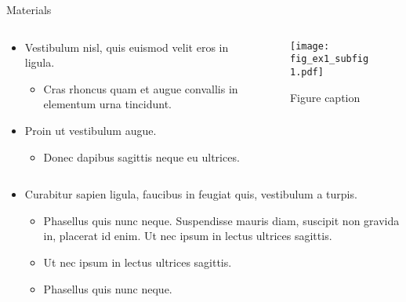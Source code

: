 \begin{block}{Materials}
	
	\begin{columns} %
		\begin{column}{.54\textwidth} %
			\begin{itemize}
				\item Vestibulum nisl, quis euismod velit eros in ligula.
				\begin{itemize}
					\item Cras rhoncus quam et augue convallis in elementum urna tincidunt.
				\end{itemize}
				\item Proin ut vestibulum augue.
				\begin{itemize}
					\item Donec dapibus sagittis neque eu ultrices.
				\end{itemize}
			\end{itemize}
		\end{column}
		
		\begin{column}{.43\textwidth} %
			\centering
			\begin{figure}
				\texttt{[image: fig\_ex1\_subfig1.pdf]}
				\caption{Figure caption}
			\end{figure}
		\end{column}
	\end{columns} %
	
	\begin{itemize}
		\item Curabitur sapien ligula, faucibus in feugiat quis, vestibulum a turpis.
		\begin{itemize}
			\item Phasellus quis nunc neque. Suspendisse mauris diam, suscipit non gravida in, placerat id enim. Ut nec ipsum in lectus ultrices sagittis.
			\item Ut nec ipsum in lectus ultrices sagittis.
			\item Phasellus quis nunc neque.
		\end{itemize}
	\end{itemize}
	
\end{block}


